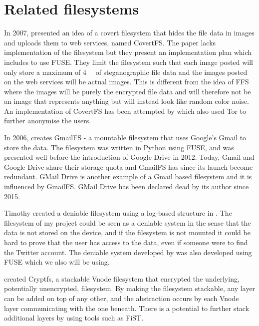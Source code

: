 \section{Related filesystems}
In 2007, \citeauthor{baliga2007web} presented an idea of a covert filesystem that hides the file data in images and uploads them to web services, named CovertFS\cite{baliga2007web}. The paper lacks implementation of the filesystem but they present an implementation plan which includes to use FUSE.  They limit the filesystem such that each image posted will only store a maximum of \SI{4}{\kilo\byte} of steganographic file data and the images posted on the web services will be actual images. This is different from the idea of FFS where the images will be purely the encrypted file data and will therefore not be an image that represents anything but will instead look like random color noise. An implementation of CovertFS has been attempted by \citeauthor{sosaSuperSecretFile2007} which also used Tor to further anonymise the users\cite{sosaSuperSecretFile2007}.

In 2006, \citeauthor{jonesGoogleHackUse2006} creates GmailFS - a mountable filesystem that uses Google's Gmail to store the data\cite{jonesGoogleHackUse2006}\cite{jonesGmailFilesystemImplementation2006}. The filesystem was written in Python using FUSE, and was presented well before the introduction of Google Drive in 2012. Today, Gmail and Google Drive share their storage quota and GmailFS has since its launch become redundant. GMail Drive is another example of a Gmail based filesystem and it is influenced by GmailFS\cite{viksoeViksoeDkGMail2004}. GMail Drive has been declared dead by its author since 2015.

Timothy \citeauthor{petersDEFYDeniableFile2014} created a deniable filesystem using a log-based structure in \citeyear{petersDEFYDeniableFile2014}\cite{petersDEFYDeniableFile2014}. The filesystem of my project could be seen as a deniable system in the sense that the data is not stored on the device, and if the filesystem is not mounted it could be hard to prove that the user has access to the data, even if someone were to find the Twitter account. The deniable system developed by \citeauthor{petersDEFYDeniableFile2014} was also developed using FUSE\cite{Libfuse2021} which we also will be using.

\citeauthor{badulescuCryptfsStackableVnode1998} created Cryptfs, a stackable Vnode filesystem that encrypted the underlying, potentially unencrypted, filesystem\cite{badulescuCryptfsStackableVnode1998}. By making the filesystem stackable, any layer can be added on top of any other, and the abstraction occurs by each Vnode layer communicating with the one beneath. There is a potential to further stack additional layers by using tools such as FiST\cite{FiSTStackableFile}.